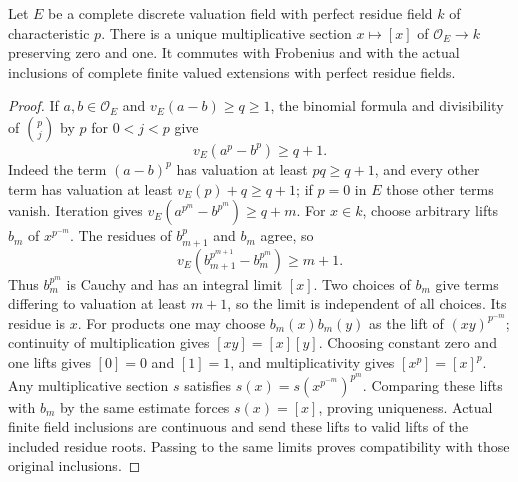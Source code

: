 \begin{lemma}
\label{fw:perfect-multiplicative-residue-lifts}
\leanok
Let $E$ be a complete discrete valuation field with perfect residue
field $k$ of characteristic $p$. There is a unique multiplicative
section $x\mapsto[x]$ of $\mathcal O_E\to k$ preserving zero and one.
It commutes with Frobenius and with the actual inclusions of complete
finite valued extensions with perfect residue fields.
\end{lemma}
\begin{proof}
If $a,b\in\mathcal O_E$ and $v_E(a-b)\geq q\geq1$, the binomial
formula and divisibility of $\binom pj$ by $p$ for $0<j<p$ give
\[
 v_E(a^p-b^p)\geq q+1.
\]
Indeed the term $(a-b)^p$ has valuation at least $pq\geq q+1$,
and every other term has valuation at least $v_E(p)+q\geq q+1$;
if $p=0$ in $E$ those other terms vanish. Iteration gives
$v_E(a^{p^m}-b^{p^m})\geq q+m$.
For $x\in k$, choose arbitrary lifts $b_m$ of $x^{p^{-m}}$.
The residues of $b_{m+1}^p$ and $b_m$ agree, so
\[
 v_E(b_{m+1}^{p^{m+1}}-b_m^{p^m})\geq m+1.
\]
Thus $b_m^{p^m}$ is Cauchy and has an integral limit $[x]$.
Two choices of $b_m$ give terms differing to valuation at least $m+1$,
so the limit is independent of all choices. Its residue is $x$.
For products one may choose $b_m(x)b_m(y)$ as the lift of
$(xy)^{p^{-m}}$; continuity of multiplication gives
$[xy]=[x][y]$. Choosing constant zero and one lifts gives $[0]=0$
and $[1]=1$, and multiplicativity gives $[x^p]=[x]^p$.
Any multiplicative section $s$ satisfies
$s(x)=s(x^{p^{-m}})^{p^m}$. Comparing these lifts with $b_m$ by the
same estimate forces $s(x)=[x]$, proving uniqueness.
Actual finite field inclusions are continuous and send these lifts
to valid lifts of the included residue roots. Passing to the same
limits proves compatibility with those original inclusions.
\end{proof}

